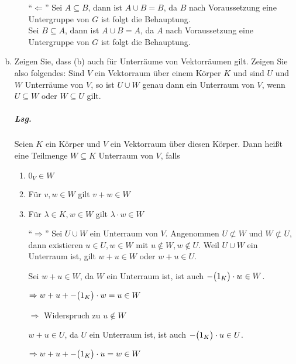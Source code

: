 \documentclass{scrreprt}
\begin{document}
\begin{enumerate}[(a)]
\begin{itemize}
  \item[``$\Leftarrow$''] Sei $A \subseteq B$, dann ist $A \cup B = B$,
    da $B$ nach Voraussetzung eine Untergruppe von $G$ ist folgt die
    Behauptung. \\
    Sei $B \subseteq A$, dann ist $A \cup B = A$,
    da $A$ nach Voraussetzung eine Untergruppe von $G$ ist folgt die
    Behauptung.
  \end{itemize}

\newpage
\item Zeigen Sie, dass (b) auch für Unterräume von Vektorräumen gilt.
  Zeigen Sie also folgendes: Sind $V$ ein Vektorraum über einem Körper $K$
  und sind $U$ und $W$ Unterräume von $V$, so ist $U \cup W$ genau dann ein
  Unterraum von $V$, wenn $U \subseteq W$ oder $W \subseteq U$ gilt.

  \subparagraph{Lsg.} Seien $K$ ein Körper und $V$ ein Vektorraum über diesen
  Körper.
  Dann heißt eine Teilmenge $W \subseteq K$ Unterraum von $V$, falls
  \begin{enumerate}[(1)]
  \item $0_V \in W$
  \item Für $v, w \in W$ gilt $v + w \in W$
  \item Für $\lambda \in K, w \in W$ gilt $\lambda \cdot w \in W$
  \end{enumerate}

  \begin{itemize}
  \item[``$\Rightarrow$''] Sei $U \cup W$ ein Unterraum von $V$.
    Angenommen $U \not\subset W$ und $W \not\subset U$, dann existieren
    $u \in U, w \in W$ mit $u \notin W, w \notin U$.
    Weil $U \cup W$ ein Unterraum ist, gilt $w + u \in W$ oder $w + u \in U$.

    \begin{minipage}{0.4\textwidth}
      Sei $w + u \in W$, da $W$ ein Unterraum ist, ist auch
      $-\qty\big(1_K) \cdot w \in W$.

      $\Rightarrow w + u + -\qty\big(1_K) \cdot w = u \in W$

      $\Rightarrow$ Widerspruch zu $u \notin W$
    \end{minipage}
    \hfill
    \vrule
    \hfill
    \begin{minipage}{0.4\textwidth}
      $w + u \in U$, da $U$ ein Unterraum ist, ist auch
      $-\qty\big(1_K) \cdot u \in U$.

      $\Rightarrow w + u + -\qty\big(1_K) \cdot u = w \in W$


\end{minipage}
\end{itemize}
\end{enumerate}
\end{document}
